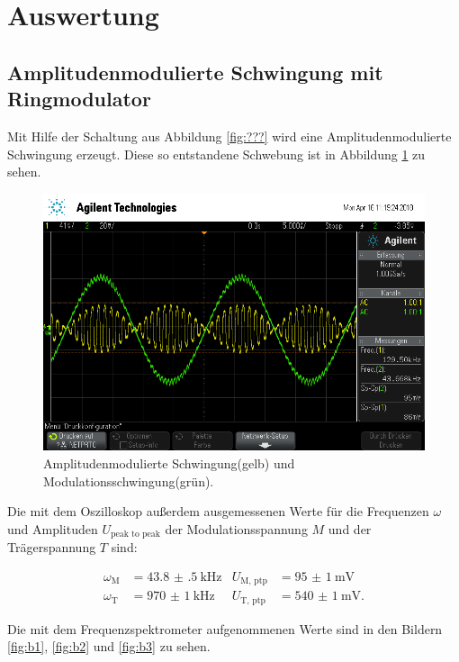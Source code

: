 \section{Auswertung}
\label{sec:Auswertung}

\subsection{Amplitudenmodulierte Schwingung mit Ringmodulator}

Mit Hilfe der Schaltung aus Abbildung \ref{fig:???} wird eine Amplitudenmodulierte Schwingung erzeugt.
Diese so entstandene Schwebung ist in Abbildung \ref{fig:amplModOszi} zu sehen.

\begin{figure}[H]
  \centering
  \includegraphics[width=\textwidth]{Oszi_Pics/amplModRing.png}
  \caption{Amplitudenmodulierte Schwingung(gelb) und Modulationsschwingung(grün).}
  \label{fig:amplModOszi}
\end{figure}

Die mit dem Oszilloskop außerdem ausgemessenen Werte für die Frequenzen $\omega$ und Amplituden $U_\text{peak to peak}$ der Modulationsspannung $M$ und der Trägerspannung $T$ sind:

\begin{align*}
  \omega_\text{M} &= \SI{43.8(5)}{\kilo\hertz} & U_\text{M, ptp} &= \SI{95(1)}{\milli\volt}\\
  \omega_\text{T} &= \SI{970(1)}{\kilo\hertz} & U_\text{T, ptp} &= \SI{540(1)}{\milli\volt}.
\end{align*}

Die mit dem Frequenzspektrometer aufgenommenen Werte sind in den Bildern \ref{fig:b1}, \ref{fig:b2} und \ref{fig:b3} zu sehen.

